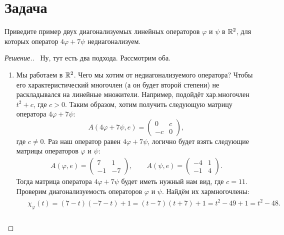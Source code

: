\documentclass[a4paper]{article}
\theoremstyle{remark}
\begin{document}
    \section*{Задача }
        Приведите пример двух диагонализуемых линейных операторов $\varphi$ и 
        $\psi$ в $\mathbb{R}^2$, для которых оператор $4\varphi + 7\psi$ недиагонализуем.
        \begin{proof}[Решение.] \ 
        Ну, тут есть два подхода. Рассмотрим оба.
        \begin{enumerate}[label=\arabic*)]
          \item Мы работаем в $\mathbb{R}^2$. Чего мы хотим от недиагонализуемого оператора? Чтобы его характеристический многочлен (а он будет второй степени) не раскладывался на линейные множители. Например, подойдёт хар.многочлен $t^2 + c$, где $c > 0$. Таким образом, хотим получить следующую матрицу оператора $4 \varphi + 7 \psi$: 
          \begin{equation*}
            A(4\varphi + 7\psi, e) = \begin{pmatrix}
              0 & c \\
              -c & 0
            \end{pmatrix},
          \end{equation*}
          где $c \neq 0$.
          Раз наш оператор равен $4 \varphi + 7 \psi$, логично будет взять следующие матрицы операторов $\varphi$ и $\psi$:
          \begin{align*}
            A(\varphi, e) = \begin{pmatrix}
              7 & 1 \\
              -1 & -7
            \end{pmatrix}, \quad\quad A(\psi, e) = \begin{pmatrix}
              -4 & 1 \\
              -1 & 4
            \end{pmatrix}.
          \end{align*}
          Тогда матрица оператора $4\varphi + 7\psi$ будет иметь нужный нам вид, где $c = 11$.
          Проверим диагонализуемость операторов $\varphi$ и $\psi$. Найдём их хармногочлены:
          \begin{align*}
            &\begin{aligned}
              \chi_\varphi(t) = (7 - t)(-7 - t) + 1 = (t - 7)(t + 7) + 1 = t^2 - 49 + 1 = t^2 - 48.
            \end{aligned} \\

\end{align*}
\end{enumerate}
\end{proof}
\end{document}
